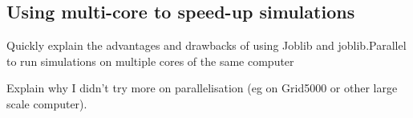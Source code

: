\begin{small}
    \inputminted[linenos=true,numbersep=5pt,frame=lines,framesep=2mm]{python3}{2-Chapters/3-Chapter/src/example_of_configuration_singleplayer.py}
\end{small}


\subsection{Using multi-core to speed-up simulations}

Quickly explain the advantages and drawbacks of using Joblib and joblib.Parallel to run simulations on multiple cores of the same computer

Explain why I didn't try more on parallelisation (eg on Grid5000 or other large scale computer).
